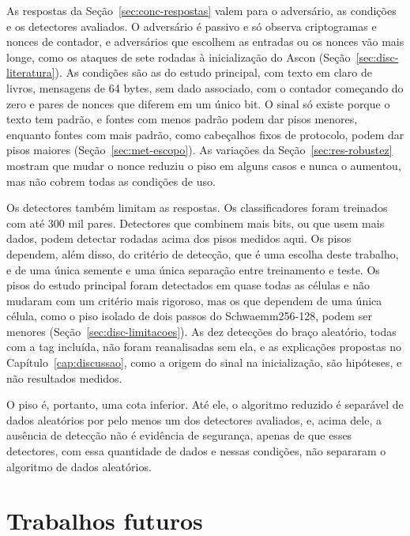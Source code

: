 As respostas da Seção~\ref{sec:conc-respostas} valem para o adversário, as condições e os detectores avaliados. O adversário é passivo e só observa criptogramas e nonces de contador, e adversários que escolhem as entradas ou os nonces vão mais longe, como os ataques de sete rodadas à inicialização do Ascon (Seção~\ref{sec:disc-literatura}). As condições são as do estudo principal, com texto em claro de livros, mensagens de 64 bytes, sem dado associado, com o contador começando do zero e pares de nonces que diferem em um único bit. O sinal só existe porque o texto tem padrão, e fontes com menos padrão podem dar pisos menores, enquanto fontes com mais padrão, como cabeçalhos fixos de protocolo, podem dar pisos maiores (Seção~\ref{sec:met-escopo}). As variações da Seção~\ref{sec:res-robustez} mostram que mudar o nonce reduziu o piso em alguns casos e nunca o aumentou, mas não cobrem todas as condições de uso.

Os detectores também limitam as respostas. Os classificadores foram treinados com até 300 mil pares. Detectores que combinem mais bits, ou que usem mais dados, podem detectar rodadas acima dos pisos medidos aqui. Os pisos dependem, além disso, do critério de detecção, que é uma escolha deste trabalho, e de uma única semente e uma única separação entre treinamento e teste. Os pisos do estudo principal foram detectados em quase todas as células e não mudaram com um critério mais rigoroso, mas os que dependem de uma única célula, como o piso isolado de dois passos do Schwaemm256-128, podem ser menores (Seção~\ref{sec:disc-limitacoes}). As dez detecções do braço aleatório, todas com a tag incluída, não foram reanalisadas sem ela, e as explicações propostas no Capítulo~\ref{cap:discussao}, como a origem do sinal na inicialização, são hipóteses, e não resultados medidos.

O piso é, portanto, uma cota inferior. Até ele, o algoritmo reduzido é separável de dados aleatórios por pelo menos um dos detectores avaliados, e, acima dele, a ausência de detecção não é evidência de segurança, apenas de que esses detectores, com essa quantidade de dados e nessas condições, não separaram o algoritmo de dados aleatórios.

\section{Trabalhos futuros}
\label{sec:conc-futuros}

